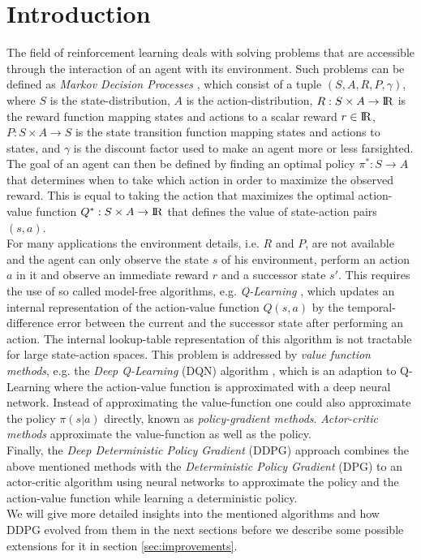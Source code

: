 \section{Introduction}
\label{sec:intro}
The field of reinforcement learning deals with solving problems that are accessible through the interaction of an agent with its environment. Such problems can be defined as \textit{Markov Decision Processes} \citep{howard1960dynamic}, which consist of a tuple $(S, A, R, P, \gamma)$, where $S$ is the state-distribution, $A$ is the action-distribution, $R:S\times A\rightarrow {\rm I\!R}$ is the reward function mapping states and actions to a scalar reward $r\in{\rm I\!R}$, $P:S\times  A \rightarrow S$ is the state transition function mapping states and actions to states, and $\gamma$ is the discount factor used to make an agent more or less farsighted. The goal of an agent can then be defined by finding an optimal policy $\pi^*:S\rightarrow A$ that determines when to take which action in order to maximize the observed reward. This is equal to taking the action that maximizes the optimal action-value function $Q^*:S \times A \rightarrow {\rm I\!R}$ that defines the value of state-action pairs $(s, a)$.\\ 
For many applications the environment details, i.e. $R$ and $P$, are not available and the agent can only observe the state $s$ of his environment, perform an action $a$ in it and observe an immediate reward $r$ and a successor state $s'$. This requires the use of so called model-free algorithms, e.g. \textit{Q-Learning} \citep{watkins1992q}, which updates an internal representation of the action-value function $Q(s,a)$ by the temporal-difference error between the current and the successor state after performing an action. The internal lookup-table representation of this algorithm is not tractable for large state-action spaces. This problem is addressed by \textit{value function methods}, e.g. the \textit{Deep Q-Learning} (DQN) algorithm \citep{mnih2013playing}, which is an adaption to Q-Learning where the action-value function is approximated with a deep neural network. Instead of approximating the value-function one could also approximate the policy $\pi(s|a)$ directly, known as \textit{policy-gradient methods}. \textit{Actor-critic methods} \citep{konda2000actor} approximate the value-function as well as the policy.\\
Finally, the \textit{Deep Deterministic Policy Gradient} (DDPG) approach \citep{lillicrap2015continuous} combines the above mentioned methods with the \textit{Deterministic Policy Gradient} (DPG) \citep{silver2014deterministic} to an actor-critic algorithm using neural networks to approximate the policy and the action-value function while learning a deterministic policy.\\
We will give more detailed insights into the mentioned algorithms and how DDPG evolved from them in the next sections before we describe some possible extensions for it in section \ref{sec:improvements}.

